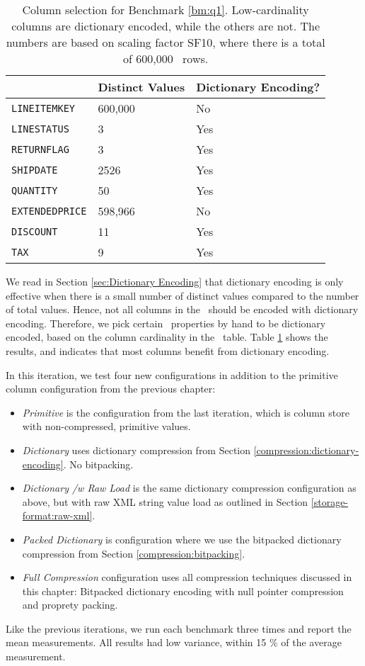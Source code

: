 \begin{table}
    \begin{tabularx}{\textwidth}{X | X X}
        & Distinct Values & Dictionary Encoding? \\ 
        \hline
        \hline
        \texttt{LINEITEMKEY} & 600,000 & No \\
        \texttt{LINESTATUS} & 3 & Yes \\
        \texttt{RETURNFLAG} & 3 & Yes \\
        \texttt{SHIPDATE} & 2526 & Yes \\
        \texttt{QUANTITY} & 50 & Yes \\
        \texttt{EXTENDEDPRICE} & 598,966 & No \\
        \texttt{DISCOUNT} & 11 & Yes \\
        \texttt{TAX} & 9 & Yes
    \end{tabularx}
    \caption{Column selection for Benchmark \ref{bm:q1}. Low-cardinality columns are dictionary encoded, while the others are not. The numbers are based on scaling factor SF10, where there is a total of 600,000 \lineitem~rows.}
    \label{tab:column-selection}
\end{table}

We read in Section \ref{sec:Dictionary Encoding} that dictionary encoding is only effective when there is a small number of distinct values compared to the number of total values. Hence, not all columns in the \tpchdl~should be encoded with dictionary encoding. Therefore, we pick certain \lineitem~properties by hand to be dictionary encoded, based on the column cardinality in the \lineitem~table. Table \ref{tab:column-selection} shows the results, and indicates that most columns benefit from dictionary encoding.

In this iteration, we test four new configurations in addition to the primitive column configuration from the previous chapter:
\begin{itemize}
    \item \textit{Primitive} is the configuration from the last iteration, which is column store with non-compressed, primitive values.
    \item \textit{Dictionary} uses dictionary compression from Section \ref{compression:dictionary-encoding}. No bitpacking.
    \item \textit{Dictionary /w Raw Load} is the same dictionary compression configuration as above, but with raw XML string value load as outlined in Section \ref{storage-format:raw-xml}.
    \item \textit{Packed Dictionary} is configuration where we use the bitpacked dictionary compression from Section \ref{compression:bitpacking}.
    \item \textit{Full Compression} configuration uses all compression techniques discussed in this chapter: Bitpacked dictionary encoding with null pointer compression and proprety packing.
\end{itemize}
Like the previous iterations, we run each benchmark three times and report the mean measurements. All results had low variance, within 15 \% of the average measurement.

